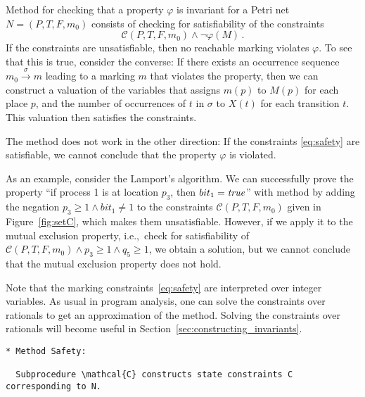 Method \safety{} for checking that a property $\varphi$ is
invariant for a Petri net $N=(P,T,F,m_0)$ consists of checking for
satisfiability of the constraints
\begin{equation}\label{eq:safety}
\mathcal{C}(P,T,F,m_0) \wedge \lnot \varphi(M)\,.
\end{equation}
If the constraints are unsatisfiable, then no reachable marking
violates $\varphi$. To see that this is true, consider the converse:
If there exists an occurrence sequence $m_0
\xrightarrow{\sigma} m$ leading to a marking $m$ that violates the
property, then we can construct a valuation of the variables that assigns $m(p)$ to
$M(p)$ for each place $p$, and the number of occurrences of $t$ in
$\sigma$ to $X(t)$ for each transition $t$. This valuation then
satisfies the constraints.

The method does not work in the other direction: If the constraints
\eqref{eq:safety} are satisfiable, we cannot conclude that the
property $\varphi$ is violated.



As an example, consider the Lamport's algorithm.
We can successfully prove the property ``if process
1 is at location $p_3$, then ${bit_1}={\operatorname{\mathit{true}}}$''
with method \safety{} by adding the negation $p_3 \geq 1 \wedge bit_1 \neq 1$
to the constraints $\mathcal{C}(P,T,F,m_0)$ given in Figure~\ref{fig:setC},
which makes them unsatisfiable.
However, if we apply it to the mutual
exclusion property, i.e.,~check for satisfiability of
$\mathcal{C}(P,T,F,m_0) \wedge p_3 \geq 1\wedge q_5 \geq 1$, we obtain
a solution, but we cannot conclude that the mutual exclusion property
does not hold.

Note that the marking constraints~\eqref{eq:safety} are interpreted over integer
variables.
As usual in program analysis, one can solve the constraints over rationals to get an approximation
of the method. Solving the constraints over rationals will become
useful in Section~\ref{sec:constructing_invariants}.

\iffalse

\begin{verbatim}
* Method Safety:

  Subprocedure \mathcal{C} constructs state constraints C corresponding to N.
\end{verbatim}



